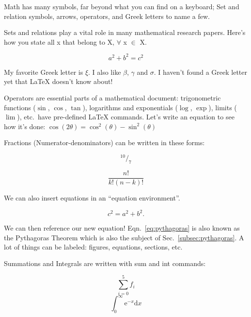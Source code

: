 \documentclass[12pt]{article}
\begin{document}
Math has many symbols, far beyond what you can find on a keyboard;
Set and relation symbols, arrows, operators, and Greek letters to name a few.

Sets and relations play a vital role in many mathematical research papers.
Here's how you state all x that belong to X, $\forall$ x $\in$ X.

\[a^2 + b^2 = c^2 \]

My favorite Greek letter is $\xi$. I also like $\beta$, $\gamma$ and $\sigma$.
I haven't found a Greek letter yet that \LaTeX{} doesn't know
about!

Operators are essential parts of a mathematical document:
trigonometric functions ($\sin$, $\cos$, $\tan$),
logarithms and exponentials ($\log$, $\exp$),
limits ($\lim$), etc.\ 
have pre-defined LaTeX commands.
Let's write an equation to see how it's done:
$\cos(2\theta) = \cos^{2}(\theta) - \sin^{2}(\theta)$

Fractions (Numerator-denominators) can be written in these forms:

$$ ^{10}/_{7} $$

$$ \frac{n!}{k!(n - k)!} $$

We can also insert equations in an ``equation environment''.

\begin{equation} %
    c^2 = a^2 + b^2.
    \label{eq:pythagoras} %
\end{equation} %

We can then reference our new equation!
Eqn.~\ref{eq:pythagoras} is also known as the Pythagoras Theorem which is also
the subject of Sec.~\ref{subsec:pythagoras}. A lot of things can be labeled:
figures, equations, sections, etc.

Summations and Integrals are written with sum and int commands:

\begin{equation}
  \sum_{i=0}^{5} f_{i}
\end{equation}
\begin{equation}
  \int_{0}^{\infty} \mathrm{e}^{-x} \mathrm{d}x
\end{equation}
\end{document}
